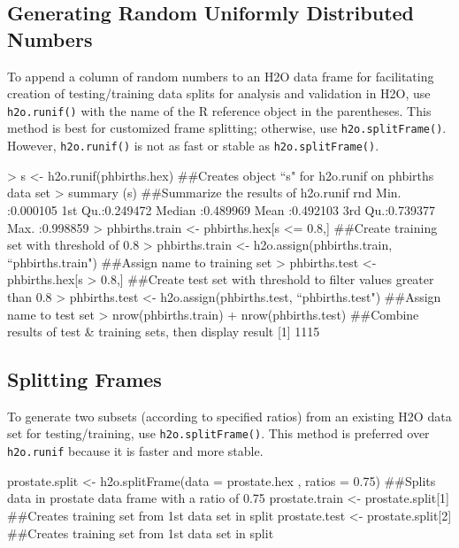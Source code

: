 \documentclass[11pt]{article}
\begin{document}
\subsection{Generating Random Uniformly Distributed Numbers}

To append a column of random numbers to an H2O data frame for facilitating creation of testing/training data splits for analysis and validation in H2O, use {\texttt{h2o.runif()}} with the name of the R reference object in the parentheses. This method is best for customized frame splitting; otherwise, use {\texttt{h2o.splitFrame()}}. However, {\texttt{h2o.runif()}} is not as fast or stable as {\texttt{h2o.splitFrame()}}. 

\begin{spverbatim}
> s <- h2o.runif(phbirths.hex) ##Creates object “s" for h2o.runif on phbirths data set
> summary (s)  ##Summarize the results of h2o.runif
 rnd               
 Min.   :0.000105  
 1st Qu.:0.249472  
 Median :0.489969  
 Mean   :0.492103  
 3rd Qu.:0.739377  
 Max.   :0.998859  
> phbirths.train <- phbirths.hex[s <= 0.8,] ##Create training set with threshold of 0.8
> phbirths.train <- h2o.assign(phbirths.train, “phbirths.train") ##Assign name to training set
> phbirths.test <- phbirths.hex[s > 0.8,] ##Create test set with threshold to filter values greater than 0.8
> phbirths.test <- h2o.assign(phbirths.test, “phbirths.test") ##Assign name to test set
> nrow(phbirths.train) + nrow(phbirths.test) ##Combine results of test & training sets, then display result
[1] 1115
\end{spverbatim}
 

\subsection{Splitting Frames}

To generate two subsets (according to specified ratios) from an existing H2O data set for testing/training, use {\texttt{h2o.splitFrame()}}.  This method is preferred over {\texttt{h2o.runif}} because it is faster and more stable. 

\begin{spverbatim}
prostate.split <- h2o.splitFrame(data = prostate.hex , ratios = 0.75)
##Splits data in prostate data frame with a ratio of 0.75
prostate.train <- prostate.split[1] 
##Creates training set from 1st data set in split
prostate.test <- prostate.split[2]
##Creates training set from 1st data set in split
\end{spverbatim}
\end{document}

